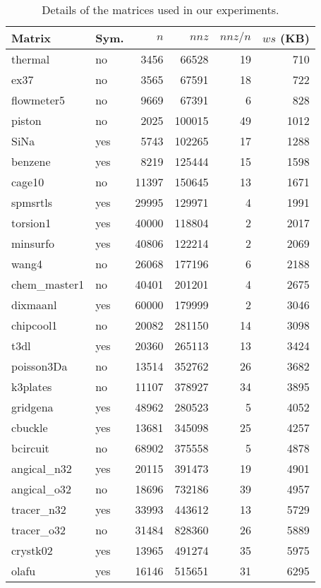\documentclass[11pt]{article}
\begin{document}
\begin{table}[!t]
\caption{Details of the matrices used in our experiments.}
\label{tab:matrices-details}
\centering
{\scriptsize
\begin{tabularx}{0.485\textwidth}{@{}ll@{\ \ }rrrr@{}}
\toprule
Matrix & Sym. & $n$ & $nnz$ & $nnz/n$ & $ws$ (KB)\\
\midrule
thermal & no & 3456 & 66528 & 19 & 710 \\
ex37 & no & 3565 & 67591 & 18 & 722 \\
flowmeter5 & no & 9669 & 67391 & 6 & 828 \\
piston & no & 2025 & 100015 & 49 & 1012 \\
SiNa & yes & 5743 & 102265 & 17 & 1288 \\
benzene & yes & 8219 & 125444 & 15 & 1598 \\
cage10 & no & 11397 & 150645 & 13 & 1671 \\
spmsrtls & yes & 29995 & 129971 & 4 & 1991 \\
torsion1 & yes & 40000 & 118804 & 2 & 2017 \\
minsurfo & yes & 40806 & 122214 & 2 & 2069 \\
wang4 & no & 26068 & 177196 & 6 & 2188 \\
chem\_master1 & no & 40401 & 201201 & 4 & 2675 \\
dixmaanl & yes & 60000 & 179999 & 2 & 3046 \\
chipcool1 & no & 20082 & 281150 & 14 & 3098 \\
t3dl & yes & 20360 & 265113 & 13 & 3424 \\
poisson3Da & no & 13514 & 352762 & 26 & 3682 \\
k3plates & no & 11107 & 378927 & 34 & 3895 \\
gridgena & yes & 48962 & 280523 & 5 & 4052 \\
cbuckle & yes & 13681 & 345098 & 25 & 4257 \\
bcircuit & no & 68902 & 375558 & 5 & 4878 \\
angical\_n32 & yes & 20115 & 391473 & 19 & 4901 \\
angical\_o32 & no & 18696 & 732186 & 39 & 4957 \\
tracer\_n32 & yes & 33993 & 443612 & 13 & 5729 \\
tracer\_o32 & no & 31484 & 828360 & 26 & 5889 \\
crystk02 & yes & 13965 & 491274 & 35 & 5975 \\
olafu & yes & 16146 & 515651 & 31 & 6295 \\

\end{tabularx}}
\end{table}
\end{document}
